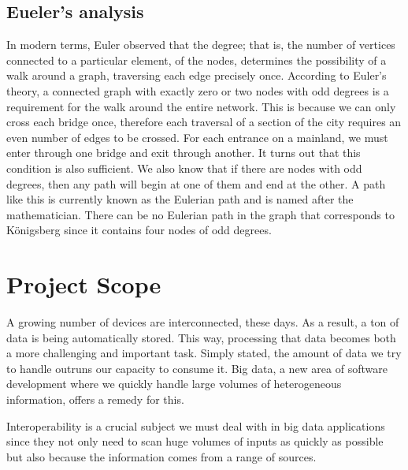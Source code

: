 \subsection{Eueler's analysis}

In modern terms, Euler observed that the degree; that is, the number of vertices connected to a particular element, of the nodes, determines the possibility of a walk around a graph, traversing each edge precisely once. According to Euler's theory, a connected graph with exactly zero or two nodes with odd degrees is a requirement for the walk around the entire network. This is because we can only cross each bridge once, therefore each traversal of a section of the city requires an even number of edges to be crossed. For each entrance on a mainland, we must enter through one bridge and exit through another. It turns out that this condition is also sufficient. We also know that if there are nodes with odd degrees, then any path will begin at one of them and end at the other. A path like this is currently known as the Eulerian path and is named after the mathematician. There can be no Eulerian path in the graph that corresponds to Königsberg since it contains four nodes of odd degrees.

\section{Project Scope}

A growing number of devices are interconnected, these days. As a result, a ton of data is being automatically stored. This way, processing that data becomes both a more challenging and important task. Simply stated, the amount of data we try to handle outruns our capacity to consume it. Big data, a new area of software development where we quickly handle large volumes of heterogeneous information, offers a remedy for this.

Interoperability is a crucial subject we must deal with in big data applications since they not only need to scan huge volumes of inputs as quickly as possible but also because the information comes from a range of sources.

